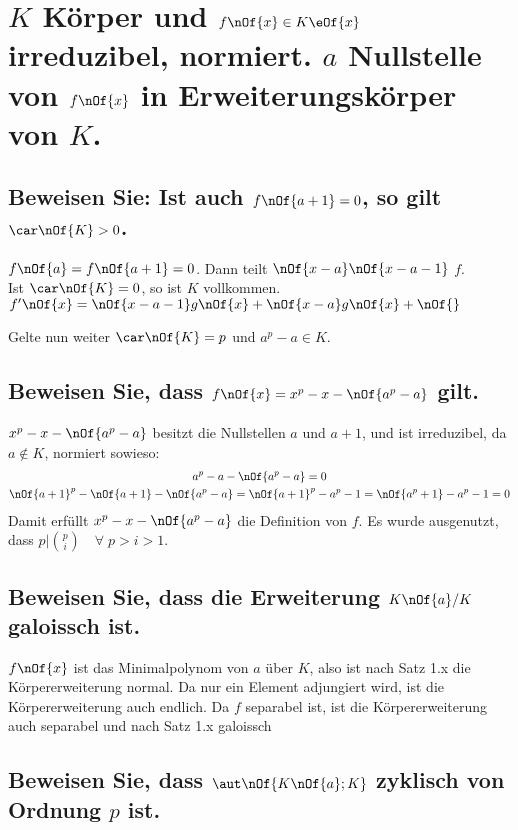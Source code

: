 \section{$K$ Körper und $f\nOf{x}\in K \eOf{x}$ irreduzibel, normiert. $a$ Nullstelle von $f\nOf{x}$ in Erweiterungskörper von $K$.}

\subsection{Beweisen Sie: Ist auch $f\nOf{a + 1} = 0$, so gilt $\car\nOf{K} > 0$.}
$f\nOf{a} = f\nOf{a+1} = 0$. Dann teilt $\nOf{x-a}\nOf{x-a-1}$ $f$.\\
Ist $\car\nOf{K} = 0$, so ist $K$ vollkommen.
$f'\nOf{x} = \nOf{x-a-1}g\nOf{x} + \nOf{x-a}g\nOf{x} + \nOf{}$

Gelte nun weiter $\car\nOf{K} = p$ und $a^p - a \in K$.
\subsection{Beweisen Sie, dass $f\nOf{x} = x^p - x - \nOf{a^p - a}$ gilt.}
$x^p - x - \nOf{a^p - a}$ besitzt die Nullstellen $a$ und $a+1$, und ist irreduzibel, da $a\notin K$, normiert sowieso:
\begin{gather}
	a^p - a - \nOf{a^p - a} = 0 \\
	\nOf{a+1}^p - \nOf{a+1} - \nOf{a^p-a} = \nOf{a+1}^p - a^p - 1 = \nOf{a^p + 1} - a^p - 1 = 0
\end{gather}
Damit erfüllt $x^p - x - \nOf{a^p - a}$ die Definition von $f$. Es wurde ausgenutzt, dass $p|\binom{p}{i} \quad \forall\; p > i > 1$.

\subsection{Beweisen Sie, dass die Erweiterung $K\nOf{a}/K$ galoissch ist.}
$f\nOf{x}$ ist das Minimalpolynom von $a$ über $K$, also ist nach Satz 1.x die Körpererweiterung normal. Da nur ein Element adjungiert wird, ist die Körpererweiterung auch endlich. Da $f$ separabel ist, ist die Körpererweiterung auch separabel und nach Satz 1.x galoissch

\subsection{Beweisen Sie, dass $\aut\nOf{K\nOf{a};K}$ zyklisch von Ordnung $p$ ist.}
